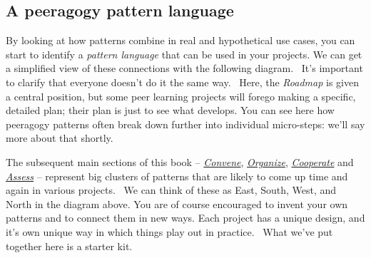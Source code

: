 

\subsection{A peeragogy pattern language}

By looking at how patterns combine in real and hypothetical use cases,
you can start to identify a \emph{pattern language} that can be used in
your projects. We can get a simplified view of these connections with
the following diagram.~ It's important to clarify that everyone doesn't
do it the same way.~ Here, the \emph{Roadmap} is given a central
position, but some peer learning projects will forego making a specific,
detailed plan; their plan is just to see what develops. You can see here
how peeragogy patterns often break down further into individual
micro-steps: we'll say more about that shortly.


The subsequent main sections of this book --
\href{http://peeragogy.org/convene/}{\emph{Convene}},
\href{http://peeragogy.org/organize/}{\emph{Organize}},
\href{http://peeragogy.org/facilitate/}{\emph{Cooperate}} and
\href{http://peeragogy.org/assessment/}{\emph{Assess}} -- represent big
clusters of patterns that are likely to come up time and again in
various projects.~ We can think of these as East, South, West, and North
in the diagram above. You are of course encouraged to invent your own
patterns and to connect them in new ways. Each project has a unique
design, and it's own unique way in which things play out in practice.~
What we've put together here is a starter kit.

